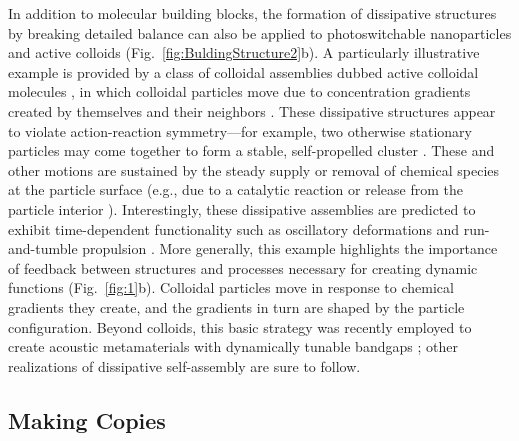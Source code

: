 \begin{appendices}
In addition to molecular building blocks, the formation of dissipative structures by breaking detailed balance can also be applied to photoswitchable nanoparticles \autocite{klajn2007light, kundu2015light, manna2015orthogonal, he2016light} and active colloids \autocite{Soto2014, soto2015self, Niu2017, Singh2017, Schmidt2018} (Fig.~\ref{fig:BuldingStructure2}b). A particularly illustrative example is provided by a class of colloidal assemblies dubbed active colloidal molecules \autocite{Lowen2018}, in which colloidal particles move due to concentration gradients created by themselves and their neighbors \autocite{Soto2014}.  These dissipative structures appear to violate action-reaction symmetry---for example, two otherwise stationary particles may come together to form a stable, self-propelled cluster \autocite{Soto2014}.  These and other motions are sustained by the steady supply or removal of chemical species at the particle surface (e.g., due to a catalytic reaction \autocite{Singh2017} or release from the particle interior \autocite{Niu2017}).  Interestingly, these dissipative assemblies are predicted to exhibit time-dependent functionality such as oscillatory deformations and run-and-tumble propulsion \autocite{soto2015self}.  More generally, this example highlights the importance of feedback between structures and processes necessary for creating dynamic functions (Fig.~\ref{fig:1}b). Colloidal particles move in response to chemical gradients they create, and the gradients in turn are shaped by the particle configuration.  Beyond colloids, this basic strategy was recently employed to create acoustic metamaterials with dynamically tunable bandgaps \autocite{bachelard2017emergence, bishop2017acoustic}; other realizations of dissipative self-assembly are sure to follow. 

\subsection{Making Copies}


\end{appendices}
